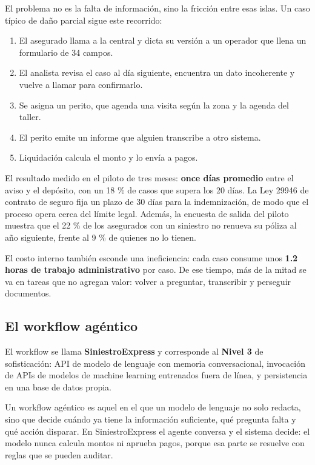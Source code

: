 \documentclass[12pt,letterpaper]{article}
\begin{document}
El problema no es la falta de información, sino la fricción entre esas islas. Un caso
típico de daño parcial sigue este recorrido:

\begin{enumerate}[itemsep=2pt]
  \item El asegurado llama a la central y dicta su versión a un operador que llena un
        formulario de 34 campos.
  \item El analista revisa el caso al día siguiente, encuentra un dato incoherente y
        vuelve a llamar para confirmarlo.
  \item Se asigna un perito, que agenda una visita según la zona y la agenda del taller.
  \item El perito emite un informe que alguien transcribe a otro sistema.
  \item Liquidación calcula el monto y lo envía a pagos.
\end{enumerate}

El resultado medido en el piloto de tres meses: \textbf{once días promedio} entre el
aviso y el depósito, con un 18 \% de casos que supera los 20 días. La Ley 29946 de
contrato de seguro fija un plazo de 30 días para la indemnización, de modo que el proceso
opera cerca del límite legal. Además, la encuesta de salida del piloto muestra que el
22 \% de los asegurados con un siniestro no renueva su póliza al año siguiente, frente al
9 \% de quienes no lo tienen.

El costo interno también esconde una ineficiencia: cada caso consume unos
\textbf{1.2 horas de trabajo administrativo} por caso. De ese tiempo, más de la mitad se va
en tareas que no agregan valor: volver a preguntar, transcribir y perseguir documentos.

\subsection{El workflow agéntico}

El workflow se llama \textbf{SiniestroExpress} y corresponde al \textbf{Nivel 3} de
sofisticación: API de modelo de lenguaje con memoria conversacional, invocación de APIs
de modelos de machine learning entrenados fuera de línea, y persistencia en una base de
datos propia.

Un workflow agéntico es aquel en el que un modelo de lenguaje no solo redacta, sino que
decide cuándo ya tiene la información suficiente, qué pregunta falta y qué acción
disparar. En SiniestroExpress el agente conversa y el sistema decide: el modelo nunca
calcula montos ni aprueba pagos, porque esa parte se resuelve con reglas que se pueden
auditar.
\end{document}
